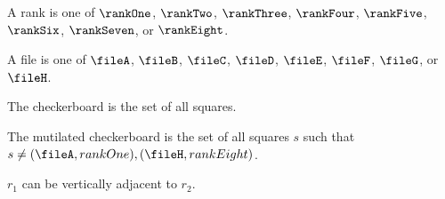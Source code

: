 

%
%
\begin{inductive}
   A rank is one of
   $\rankOne$, $\rankTwo$, $\rankThree$, $\rankFour$, $\rankFive$, $\rankSix$, $\rankSeven$, or $\rankEight$.
\end{inductive}



%
\begin{inductive}
   A file is one of
   $\fileA$, $\fileB$, $\fileC$, $\fileD$, $\fileE$, $\fileF$, $\fileG$, or $\fileH$.
\end{inductive}






\begin{definition}
   The checkerboard is the set of all squares.
\end{definition}





\begin{definition}
   The mutilated checkerboard is the set of all squares $s$
   such that $s \neq (\fileA, rankOne), (\fileH, rankEight)$.
\end{definition}





\begin{signature}
   $r_1$ can be vertically adjacent to $r_2$.
\end{signature}

